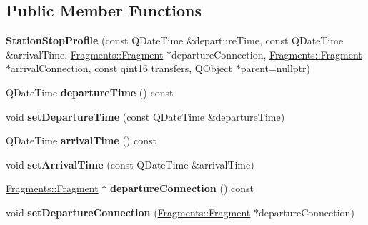 \subsection*{Public Member Functions}
\begin{DoxyCompactItemize}
\item 
\mbox{\label{classRouterEngine_1_1StationStopProfile_a2a3218afe09a357c0d3285c8967d1869}} 
{\bfseries Station\+Stop\+Profile} (const Q\+Date\+Time \&departure\+Time, const Q\+Date\+Time \&arrival\+Time, \mbox{\hyperlink{classFragments_1_1Fragment}{Fragments\+::\+Fragment}} $\ast$departure\+Connection, \mbox{\hyperlink{classFragments_1_1Fragment}{Fragments\+::\+Fragment}} $\ast$arrival\+Connection, const qint16 transfers, Q\+Object $\ast$parent=nullptr)
\item 
\mbox{\label{classRouterEngine_1_1StationStopProfile_a33812d3bad70605339ef02e9daf5420e}} 
Q\+Date\+Time {\bfseries departure\+Time} () const
\item 
\mbox{\label{classRouterEngine_1_1StationStopProfile_a9c734fbc59ba68448e725fd6c958f52e}} 
void {\bfseries set\+Departure\+Time} (const Q\+Date\+Time \&departure\+Time)
\item 
\mbox{\label{classRouterEngine_1_1StationStopProfile_ad578fd8f9e9d5040cd298050ea07400a}} 
Q\+Date\+Time {\bfseries arrival\+Time} () const
\item 
\mbox{\label{classRouterEngine_1_1StationStopProfile_a1e3def0943616522a1fdeeb17dba701a}} 
void {\bfseries set\+Arrival\+Time} (const Q\+Date\+Time \&arrival\+Time)
\item 
\mbox{\label{classRouterEngine_1_1StationStopProfile_a78721007d3603be9e9ec705d5c41cd49}} 
\mbox{\hyperlink{classFragments_1_1Fragment}{Fragments\+::\+Fragment}} $\ast$ {\bfseries departure\+Connection} () const
\item 
\mbox{\label{classRouterEngine_1_1StationStopProfile_acdd818e9cdc82cb6f54beab215de322e}} 
void {\bfseries set\+Departure\+Connection} (\mbox{\hyperlink{classFragments_1_1Fragment}{Fragments\+::\+Fragment}} $\ast$departure\+Connection)

\end{DoxyCompactItemize}
